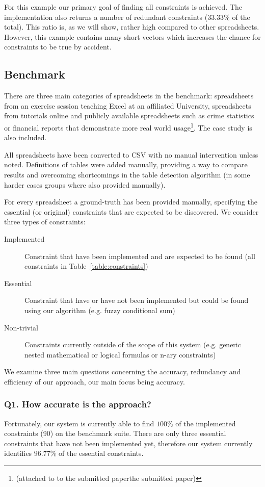 \documentclass{IEEEtran}
\theoremstyle{definition}
\begin{document}
For this example our primary goal of finding all constraints is achieved.
The implementation also returns a number of redundant constraints ($33.33\%$ of the total).
This ratio is, as we will show, rather high compared to other spreadsheets.
However, this example contains many short vectors which increases the chance for constraints to be true by accident.

\subsection{Benchmark}
There are three main categories of spreadsheets in the benchmark: spreadsheets from an exercise session teaching Excel at an affiliated University, spreadsheets from tutorials online and publicly available spreadsheets such as crime statistics or financial reports that demonstrate more real world usage\footnote{(attached to to the submitted paperthe submitted paper)}.
The case study is also included.

All spreadsheets have been converted to CSV with no manual intervention unless noted.
Definitions of tables were added manually, providing a way to compare results and overcoming shortcomings in the table detection algorithm (in some harder cases groups where also provided manually).

For every spreadsheet a ground-truth has been provided manually, specifying the essential (or original) constraints that are expected to be discovered.
We consider three types of constraints:
\begin{description}
  \item[Implemented] Constraint that have been implemented and are expected to be found (all constraints in Table~\ref{table:constraints})
  \item[Essential] Constraint that have or have not been implemented but could be found using our algorithm (e.g. fuzzy conditional sum)
  \item[Non-trivial] Constraints currently outside of the scope of this system (e.g. generic nested mathematical or logical formulas or n-ary constraints)
\end{description}

We examine three main questions concerning the accuracy, redundancy and efficiency of our approach, our main focus being accuracy.

\subsubsection*{Q1. How accurate is the approach?}
Fortunately, our system is currently able to find $100\%$ of the implemented constraints (90) on the benchmark suite.
There are only three essential constraints that have not been implemented yet, therefore our system currently identifies $96.77\%$ of the essential constraints.
\end{document}
